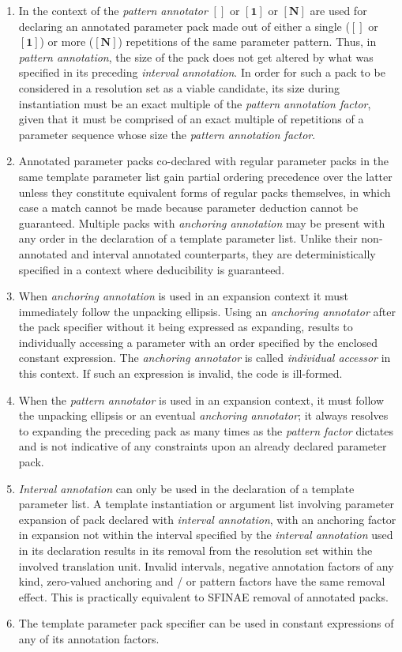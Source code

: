 \begin{enumerate}
\item\p In the context of the \textit{pattern annotator} $\bm{[]}$ or $\bm{[1]}$ or $\bm{[N]}$ are used for declaring an annotated parameter pack made out of either a single ($\bm{[]}$ or $\bm{[1]}$) or more ($\bm{[N]}$) repetitions of the same parameter pattern.
Thus, in \textit{pattern annotation}, the size of the pack does not get altered by what was specified in its preceding \textit{interval annotation}.
In order for such a pack to be considered in a resolution set as a viable candidate, its size during instantiation must be an exact multiple of the \textit{pattern annotation factor}, given that it must be comprised of an exact multiple of repetitions of a parameter sequence whose size \textbf{} the \textit{pattern annotation factor}.

\item\p Annotated parameter packs co-declared with regular parameter packs in the same template parameter list gain partial ordering precedence over the latter unless they constitute equivalent forms of regular packs themselves, in which case a match cannot be made because parameter deduction cannot be guaranteed.
Multiple packs with \textit{anchoring annotation} may be present with any order in the declaration of a template parameter list.
Unlike their non-annotated and interval annotated counterparts, they are deterministically specified in a context where deducibility is guaranteed.

\item\p When \textit{anchoring annotation} is used in an expansion context it must immediately follow the unpacking ellipsis.
Using an \textit{anchoring annotator} after the pack specifier without it being expressed as expanding, results to individually accessing a parameter with an order specified by the enclosed constant expression.
The \textit{anchoring annotator} is called \textit{individual accessor} in this context.
If such an expression is invalid, the code is ill-formed.

\item\p When the \textit{pattern annotator} is used in an expansion context, it must follow the unpacking ellipsis or an eventual \textit{anchoring annotator}; it always resolves to expanding the preceding pack as many times as the \textit{pattern factor} dictates and is not indicative of any constraints upon an already declared parameter pack.

\item\p \textit{Interval annotation} can only be used in the declaration of a template parameter list.
A template instantiation or argument list involving parameter expansion of pack declared with \textit{interval annotation}, with an anchoring factor in expansion not within the interval specified by the \textit{interval annotation} used in its declaration results in its removal from the resolution set within the involved translation unit.
Invalid intervals, negative annotation factors of any kind, zero-valued anchoring and / or pattern factors have the same removal effect.
This is practically equivalent to SFINAE removal of annotated packs.

\item\p The template parameter pack specifier can be used in constant expressions of any of its annotation factors.

\end{enumerate}